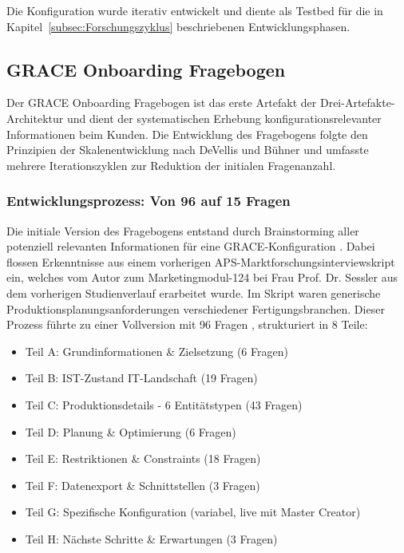 \noindent Die Konfiguration wurde iterativ entwickelt und diente als Testbed für die in Kapitel~\ref{subsec:Forschungszyklus} beschriebenen Entwicklungsphasen.


\subsection{GRACE Onboarding Fragebogen}
\label{sec:Fragebogen}

Der GRACE Onboarding Fragebogen ist das erste Artefakt der Drei-Artefakte-Architektur und dient der systematischen Erhebung konfigurationsrelevanter Informationen beim Kunden. Die Entwicklung des Fragebogens folgte den Prinzipien der Skalenentwicklung nach DeVellis \cite{devellis:scale_development2017} und Bühner \cite{buehner:test_fragebogenkonstruktion2004} und umfasste mehrere Iterationszyklen zur Reduktion der initialen Fragenanzahl.

\subsubsection{Entwicklungsprozess: Von 96 auf 15 Fragen}

Die initiale Version des Fragebogens entstand durch Brainstorming aller potenziell relevanten Informationen für eine GRACE-Konfiguration \citep{grace:gespraechstranskript_fragenkatalog2025}. Dabei flossen Erkenntnisse aus einem vorherigen APS-Marktforschungsinterviewskript ein, welches vom Autor zum Marketingmodul-124 bei Frau Prof. Dr. Sessler aus dem vorherigen Studienverlauf erarbeitet wurde. \citep{grace:interviewskript2024} Im Skript waren generische Produktionsplanungsanforderungen verschiedener Fertigungsbranchen. Dieser Prozess führte zu einer Vollversion mit 96 Fragen \citep{grace:onboarding_fragebogen_vollversion2025}, strukturiert in 8 Teile:

\begin{itemize}
    \item Teil A: Grundinformationen \& Zielsetzung (6 Fragen)
    \item Teil B: IST-Zustand IT-Landschaft (19 Fragen)
    \item Teil C: Produktionsdetails - 6 Entitätstypen (43 Fragen)
    \item Teil D: Planung \& Optimierung (6 Fragen)
    \item Teil E: Restriktionen \& Constraints (18 Fragen)
    \item Teil F: Datenexport \& Schnittstellen (3 Fragen)
    \item Teil G: Spezifische Konfiguration (variabel, live mit Master Creator)
    \item Teil H: Nächste Schritte \& Erwartungen (3 Fragen)
\end{itemize}

